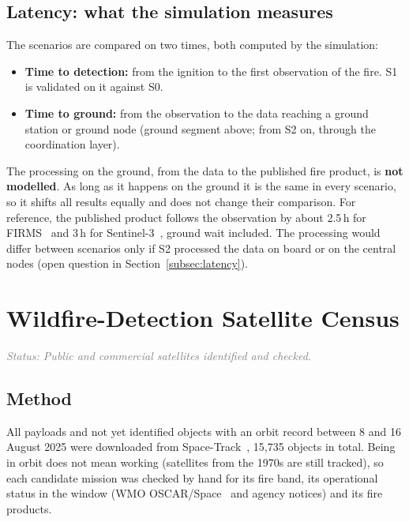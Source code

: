 \documentclass[11pt]{article}
\newcommand{\status}[1]{\textit{\textcolor{gray}{Status: #1}}}
\begin{document}
\subsection{Latency: what the simulation measures}\label{subsec:s1latency}

The scenarios are compared on two times, both computed by the simulation:
\begin{itemize}[leftmargin=1.2cm]
    \item \textbf{Time to detection:} from the ignition to the first observation of the fire. S1 is validated on it against S0.
    \item \textbf{Time to ground:} from the observation to the data reaching a ground station or ground node (ground segment above; from S2 on, through the coordination layer).
\end{itemize}
The processing on the ground, from the data to the published fire product, is \textbf{not modelled}. As long as it happens on the ground it is the same in every scenario, so it shifts all results equally and does not change their comparison. For reference, the published product follows the observation by about 2.5\,h for FIRMS~\cite{wooster2021active} and 3\,h for Sentinel-3~\cite{mecklenburg2015s3ops}, ground wait included. The processing would differ between scenarios only if S2 processed the data on board or on the central nodes (open question in Section~\ref{subsec:latency}).

\section{Wildfire-Detection Satellite Census}\label{sec:census}

\status{Public and commercial satellites identified and checked.}

\subsection{Method}

All payloads and not yet identified objects with an orbit record between 8 and 16 August 2025 were downloaded from Space-Track~\cite{spacetrack2025}, 15,735 objects in total. Being in orbit does not mean working (satellites from the 1970s are still tracked), so each candidate mission was checked by hand for its fire band, its operational status in the window (WMO OSCAR/Space~\cite{oscar2025} and agency notices) and its fire products.
\end{document}
